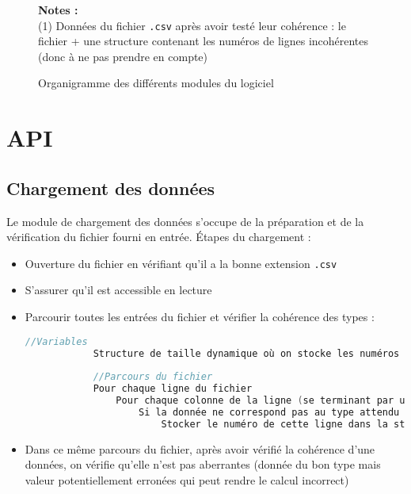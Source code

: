 \begin{center}
\begin{figure}[pb]
\begin{tikzpicture}
	\end{tikzpicture}
	
	\textbf{Notes :}\\
	(1) Données du fichier \lstinline!.csv! après avoir testé leur cohérence : le fichier + une structure contenant les numéros de lignes incohérentes (donc à ne pas prendre en compte)\\
	
	\caption{Organigramme des différents modules du logiciel}\label{fig:M1}
	\end{figure}\end{center}
	
	\section{API}
		\subsection{Chargement des données}
		Le module de chargement des données s'occupe de la préparation et de la vérification du fichier fourni en entrée. Étapes du chargement :
		\begin{itemize}
		\item Ouverture du fichier en vérifiant qu'il a la bonne extension \lstinline!.csv!
		\item S'assurer qu'il est accessible en lecture
		\item Parcourir toutes les entrées du fichier et vérifier la cohérence des types :
			\begin{lstlisting}[language=C]
			//Variables
			Structure de taille dynamique où on stocke les numéros de lignes incohérentes
			
			//Parcours du fichier
			Pour chaque ligne du fichier
				Pour chaque colonne de la ligne (se terminant par une virgule généralement)
					Si la donnée ne correspond pas au type attendu
						Stocker le numéro de cette ligne dans la structure
			\end{lstlisting}
		\item Dans ce même parcours du fichier, après avoir vérifié la cohérence d'une données, on vérifie qu'elle n'est pas aberrantes (donnée du bon type mais valeur potentiellement erronées qui peut rendre le calcul incorrect) 
		\end{itemize}
	

